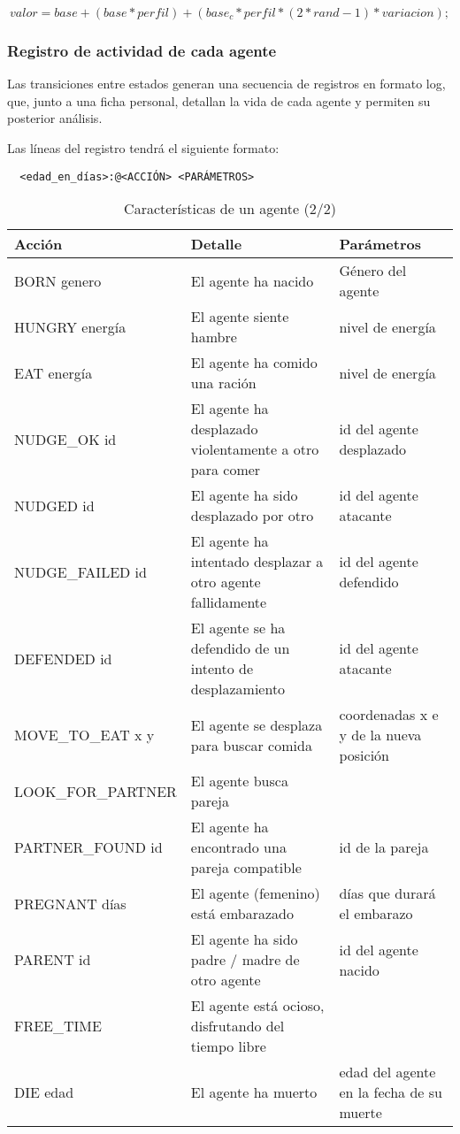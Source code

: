 $$ valor = base 
                + (base * perfil)
                + (base_c * perfil * ( 2*rand - 1) * variacion);
$$


\subsubsection{Registro de actividad de cada agente}

Las transiciones entre estados generan una secuencia de registros en formato
log, que, junto a una ficha personal, detallan la vida de cada agente y permiten
su posterior análisis.

Las líneas del registro tendrá el siguiente formato:
\begin{verbatim}
  <edad_en_días>:@<ACCIÓN> <PARÁMETROS>
\end{verbatim}

\begin{table}[h]
\centering %
\begin{tabular}{| p{4cm} | p{5cm} | p{4cm} |} %
\hline\hline
Acción & Detalle & Parámetros \\
\hline %

    BORN genero & El agente ha nacido & Género del agente \\
    HUNGRY energía & El agente siente hambre & nivel de energía \\
    EAT energía & El agente ha comido una ración & nivel de energía \\
    NUDGE\_OK id & El agente ha desplazado violentamente a otro para comer &
id del agente desplazado\\
    NUDGED id & El agente ha sido desplazado por otro & id del agente
atacante \\
    NUDGE\_FAILED id & El agente ha intentado desplazar a otro agente
fallidamente & id del agente defendido \\
    DEFENDED id & El agente se ha defendido de un intento de desplazamiento &
id del agente atacante\\
    MOVE\_TO\_EAT x y & El agente se desplaza para buscar comida &
coordenadas x e y de la nueva posición \\
    LOOK\_FOR\_PARTNER & El agente busca pareja & \\
    PARTNER\_FOUND id & El agente ha encontrado una pareja compatible & id de
la pareja \\
    PREGNANT días & El agente (femenino) está embarazado & días que durará el
embarazo \\
    PARENT id & El agente ha sido padre / madre de otro agente & id del
agente nacido \\
    FREE\_TIME & El agente está ocioso, disfrutando del tiempo libre & \\
    DIE edad & El agente ha muerto & edad del agente en la fecha de su muerte \\


\hline %
\end{tabular}
\label{tab:caracteristicas}
\caption{Características de un agente (2/2)} %
\end{table}



